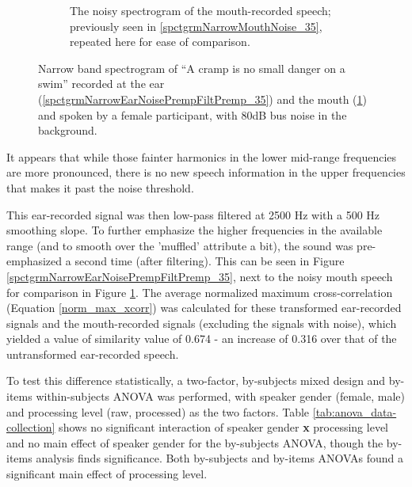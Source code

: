 \begin{figure}[b!]
\begin{subfigure}{0.475\textwidth}
  \caption{The noisy spectrogram of the mouth-recorded speech; previously seen in \ref{spctgrmNarrowMouthNoise_35}, repeated here for ease of comparison.}
  \label{spctgrmNarrowMouthNoise_35_compare}
\end{subfigure}
\caption{Narrow band spectrogram of ``A cramp is no small danger on a swim'' recorded at the ear (\ref{spctgrmNarrowEarNoisePrempFiltPremp_35}) and the mouth (\ref{spctgrmNarrowMouthNoise_35_compare}) and spoken by a female participant, with 80dB bus noise in the background.}
\label{fig:ear_pfp}
\end{figure}
It appears that while those fainter harmonics in the lower mid-range frequencies are more pronounced, there is no new speech information in the upper frequencies that makes it past the noise threshold.

This ear-recorded signal was then low-pass filtered at 2500 Hz with a 500 Hz smoothing slope. To further emphasize the higher frequencies in the available range (and to smooth over the 'muffled' attribute a bit), the sound was pre-emphasized a second time (after filtering).  This can be seen in Figure \ref{spctgrmNarrowEarNoisePrempFiltPremp_35}, next to the noisy mouth speech for comparison in Figure \ref{spctgrmNarrowMouthNoise_35_compare}.  The average normalized maximum cross-correlation (Equation \ref{norm_max_xcorr}) was calculated for these transformed ear-recorded signals and the mouth-recorded signals (excluding the signals with noise), which yielded a value of similarity value of 0.674 - an increase of 0.316 over that of the untransformed ear-recorded speech.

To test this difference statistically, a two-factor, by-subjects mixed design and by-items within-subjects ANOVA was performed, with speaker gender (female, male) and processing level (raw, processed) as the two factors.  Table \ref{tab:anova_data-collection} shows no significant interaction of speaker gender \textbf{x} processing level and no main effect of speaker gender for the by-subjects ANOVA, though the by-items analysis finds significance.  Both by-subjects and by-items ANOVAs found a significant main effect of processing level.




